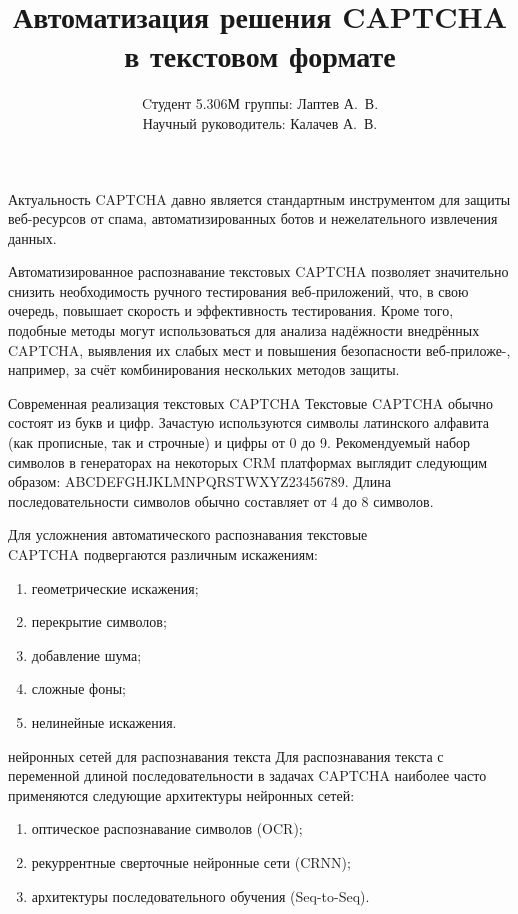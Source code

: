 \documentclass[12pt,a4paper,mathserif]{beamer}
\author[Лаптев А.В.]{{Cтудент 5.306М группы: Лаптев А.~В.}\\
{Научный руководитель: Калачев А.~В.}}
\title[Барнаул 2025]{Автоматизация решения CAPTCHA в текстовом формате}
\begin{document}
\begin{frame}
\maketitle
\end{frame}

\begin{frame}{Актуальность}
    \setlength{\parindent}{0.5cm}
    CAPTCHA давно является стандартным инструментом для защиты веб-ресурсов от спама, автоматизированных ботов и нежелательного извлечения данных.

    Автоматизированное распознавание текстовых CAPTCHA позволяет значительно снизить необходимость ручного тестирования веб-приложений, что, в свою очередь, повышает скорость и эффективность тестирования. Кроме того, подобные методы могут использоваться для анализа надёжности внедрённых CAPTCHA, выявления их слабых мест и повышения безопасности веб-приложе-, например, за счёт комбинирования нескольких методов защиты.
\end{frame}

\begin{frame}{Современная реализация текстовых CAPTCHA}
    \setlength{\parindent}{0.5cm}
    Текстовые CAPTCHA обычно состоят из букв и цифр. Зачастую используются символы латинского алфавита (как прописные, так и строчные) и цифры от 0 до 9. Рекомендуемый набор символов в генераторах на некоторых CRM платформах выглядит следующим образом: ABCDEFGHJKLMNPQRSTWXYZ23456789. Длина последовательности символов обычно составляет от 4 до 8 символов.

    Для усложнения автоматического распознавания текстовые \\CAPTCHA подвергаются различным искажениям:
    \begin{enumerate}
        \item геометрические искажения;
        \item перекрытие символов;
        \item добавление шума;
        \item сложные фоны;
        \item нелинейные искажения.
    \end{enumerate}
\end{frame}

\begin{frame}{ нейронных сетей для распознавания текста}
    \setlength{\parindent}{0.5cm}
    Для распознавания текста с переменной длиной последовательности в задачах CAPTCHA наиболее часто применяются следующие архитектуры нейронных сетей:

    \begin{enumerate}
        \item оптическое распознавание символов (OCR);
        \item рекуррентные сверточные нейронные сети (CRNN);
        \item архитектуры последовательного обучения (Seq-to-Seq).
    \end{enumerate}
\end{frame}
\end{document}
